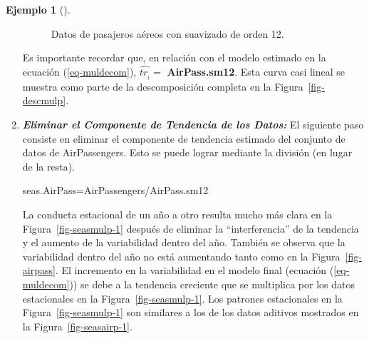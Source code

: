 \documentclass[
  us-letterpaper,
]{scrreprt}
\newenvironment{Shaded}{\begin{snugshade}}{\end{snugshade}}
\newcommand{\NormalTok}[1]{\textcolor[rgb]{0.00,0.23,0.31}{#1}}
\newcommand{\OtherTok}[1]{\textcolor[rgb]{0.00,0.23,0.31}{#1}}
\newcommand{\SpecialCharTok}[1]{\textcolor[rgb]{0.37,0.37,0.37}{#1}}
\theoremstyle{plain}
\theoremstyle{definition}
\theoremstyle{definition}
\newtheorem{example}{Ejemplo}[chapter]
\theoremstyle{plain}
\theoremstyle{remark}
\begin{document}
\begin{example}[]
\begin{tcolorbox}
\begin{enumerate}
\begin{figure}[H]
{  }

  \caption{\label{fig-smapp}Datos de pasajeros aéreos con suavizado de
  orden 12.}

  \end{figure}%

  Es importante recordar que, en relación con el modelo estimado en la
  ecuación (\ref{eq-muldecom}), \(\hat{tr_{_t}} =\)
  \textbf{AirPass.sm12}. Esta curva casi lineal se muestra como parte de
  la descomposición completa en la Figura~\ref{fig-descmulp}.
\item
  \textbf{\emph{Eliminar el Componente de Tendencia de los Datos:}} El
  siguiente paso consiste en eliminar el componente de tendencia
  estimado del conjunto de datos de AirPassengers. Esto se puede lograr
  mediante la división (en lugar de la resta).

\begin{Shaded}
\begin{Highlighting}[]
\NormalTok{seas.AirPass}\OtherTok{=}\NormalTok{AirPassengers}\SpecialCharTok{/}\NormalTok{AirPass.sm12}
\end{Highlighting}
\end{Shaded}

  La conducta estacional de un año a otro resulta mucho más clara en la
  Figura~\ref{fig-seasmulp-1} después de eliminar la ``interferencia''
  de la tendencia y el aumento de la variabilidad dentro del año.
  También se observa que la variabilidad dentro del año no está
  aumentando tanto como en la Figura~\ref{fig-airpass}. El incremento en
  la variabilidad en el modelo final (ecuación (\ref{eq-muldecom})) se
  debe a la tendencia creciente que se multiplica por los datos
  estacionales en la Figura~\ref{fig-seasmulp-1}. Los patrones
  estacionales en la Figura~\ref{fig-seasmulp-1} son similares a los de
  los datos aditivos mostrados en la Figura~\ref{fig-seasairp-1}.
\end{enumerate}

\begin{figure}[H]

\begin{minipage}{0.50\linewidth}

\end{minipage}
\end{figure}
\end{tcolorbox}
\end{example}
\end{document}
